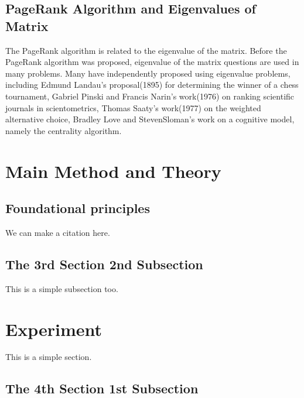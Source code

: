 \documentclass[lettersize,journal,12pt]{IEEEtran}
\begin{document}
\subsection{PageRank Algorithm and Eigenvalues of Matrix}

The PageRank algorithm is related to the eigenvalue of the matrix. Before the PageRank algorithm was proposed, eigenvalue of the matrix questions are used in many problems. Many have independently proposed using eigenvalue problems, including Edmund Landau's proposal(1895) for determining the winner of a chess tournament, Gabriel Pinski and Francis Narin's work(1976) on ranking scientific journals in scientometrics, Thomas Saaty's work(1977) on the weighted alternative choice, Bradley Love and StevenSloman's work on a cognitive model, namely the centrality algorithm. 

\section{Main Method and Theory}

\subsection{Foundational principles}




We can make a citation here. \cite{ref1}



\subsection{The 3rd Section 2nd Subsection}

This is a simple subsection too.
\section{Experiment}

This is a simple section.
\subsection{The 4th Section 1st Subsection}
\end{document}
